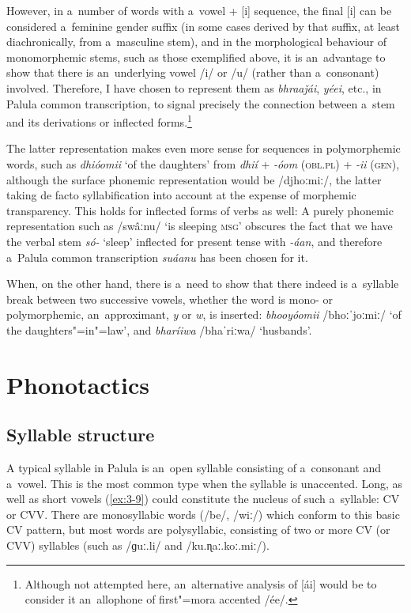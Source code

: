 However, in a~number of words with a~vowel + [i] sequence, the final [i] can be considered a~feminine gender suffix (in some cases derived by that suffix, at least diachronically, from a~masculine stem), and in the morphological behaviour of monomorphemic stems, such as those exemplified above, it is an~advantage to show that there is an~underlying vowel /i/ or /u/ (rather than a~consonant) involved. Therefore, I have chosen to represent them as \textit{bhraaǰái}, \textit{yéei}, etc., in Palula common transcription, to signal precisely the connection between a~stem and its derivations or inflected forms.\footnote{Although not attempted here, an~alternative analysis of [ái] would be to consider it an~allophone of first"=mora accented /ée/.} 


The latter representation makes even more sense for sequences in polymorphemic words, such as \textit{dhióomii} `of the daughters' from \textit{dhií} + \textit{-óom} (\textsc{obl.pl)} + \textit{-ii} (\textsc{gen)}, although the surface phonemic representation would be /djhoːmiː/, the latter taking de facto syllabification into account at the expense of morphemic transparency. This holds for inflected forms of verbs as well: A purely phonemic representation such as /swâːnu/ `is sleeping \textsc{msg}' obscures the fact that we have the verbal stem \textit{só-} `sleep' inflected for present tense with \textit{-áan}, and therefore a~Palula common transcription \textit{suáanu} has been chosen for it.


When, on the other hand, there is a~need to show that there indeed is a~syllable break between two successive vowels, whether the word is mono- or polymorphemic, an~approximant, \textit{y} or \textit{w}, is inserted: \textit{bhooyóomii} /bhoːˈjoːmiː/ `of the daughters"=in"=law', and \textit{bharíiwa} /bhaˈriːwa/ `husbands'.


\section{Phonotactics}
\label{sec:3-3}

\subsection{Syllable structure}
\label{subsec:3-3-1}


A typical syllable in Palula is an~open syllable consisting of a~consonant and a~vowel. This is the most common type when the syllable is unaccented. Long, as well as short vowels (\ref{ex:3-9}) could constitute the nucleus of such a~syllable: CV or CVV. There are monosyllabic words (/be/, /wiː/) which conform to this basic CV pattern, but most words are polysyllabic, consisting of two or more CV (or CVV) syllables (such as /ɡuː.li/ and /ku.ɳaː.koː.miː/).


